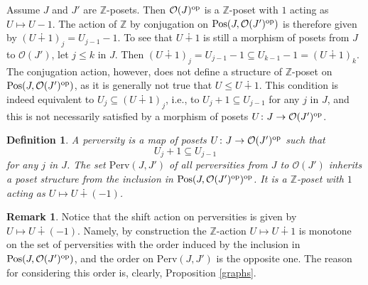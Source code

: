 \documentclass{article}
\newtheorem{defn}[thm]{Definition}
\theoremstyle{definition}
\newtheorem{rem}[thm]{Remark}
\newcommand{\Z}{\mathbb{Z}}
\newcommand{\Oo}{\mathcal{O}}
\newcommand{\pos}{\textnormal{Pos}}
\newcommand{\op}{\textnormal{op}}
\begin{document}
Assume $J$ and $J'$ are $\Z$-posets. Then $\Oo(J)^\op$ is a $\Z$-poset with $1$ acting as $U\mapsto U-1$. The action of $\Z$ by conjugation on $\pos(J,\Oo(J')^\op)$ is therefore given by $(U\dotplus 1)_j=U_{j-1}-1$. To see that $U\dotplus 1$ is still a morphism of posets from $J$ to $\Oo(J')$, let $j\leq k$ in $J$. Then $(U\dotplus 1)_j=U_{j-1}-1\subseteq U_{k-1}-1=(U\dotplus 1)_k$. 
The conjugation action, however, does not define a structure of $\Z$-poset on $\pos(J,\Oo(J')^\op)$, as it is generally not true that $U\leq U\dotplus1$. This condition is indeed equivalent to $U_{j}\subseteq (U\dotplus 1)_{j}$, i.e., to $U_{j}+1\subseteq U_{j-1}$ for any $j$ in $J$, and this is not necessarily satisfied by a morphism of posets $U\colon J\to \Oo(J')^\op$. 
\begin{defn}
A \emph{perversity} is a map of posets $U\colon J\to \Oo(J')^\op$ such that 
\[
U_{j}+1\subseteq U_{j-1}%
\]
for any $j$ in $J$. The set $\mathrm{Perv}(J,J')$ of all perversities from $J$ to $\Oo(J')$ inherits a poset structure from the inclusion in $\pos(J,\Oo(J')^\op)^\op$. It is a $\Z$-poset with $1$ acting as $U\mapsto U\dotplus(-1)$.
\end{defn}
\begin{rem}
Notice that the shift action on perversities is given by  $U\mapsto U\dotplus(-1)$. Namely, by construction the $\Z$-action $U\mapsto U\dotplus 1$ is monotone on the set of perversities with the order induced by the inclusion in $\pos(J,\Oo(J')^\op)$, and the order on $\mathrm{Perv}(J,J')$ is the opposite one. The reason for considering this order is, clearly, Proposition \ref{graphs}.
\end{rem}
\end{document}
